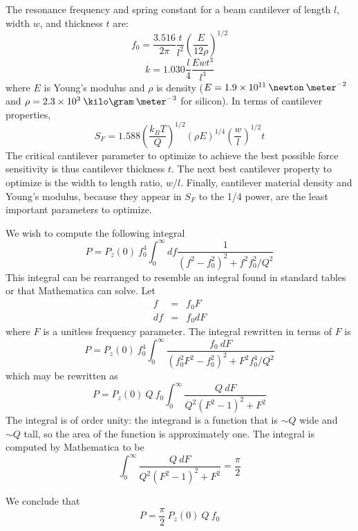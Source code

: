 \label{sect:cantilever-design}

The resonance frequency and spring constant for a beam cantilever of
length $l$, width $w$, and thickness $t$ are:
\begin{equation}
f_0 = \frac{3.516}{2 \pi} \frac{t}{l^2} \left( \frac{E}{12 \rho} \right)^{1/2}
\end{equation}
\begin{equation}
k = 1.030 \frac{l}{4} \frac{E w t^3}{l^3}
\end{equation}
where $E$ is Young's modulus and $\rho$ is density ($E = 1.9 \times
10^{11} \: \newton \: \meter^{-2}$ and $\rho = 2.3 \times 10^{3} \:
\kilo\gram \: \meter^{-3}$ for silicon).  In terms of cantilever properties,
\begin{equation}
S_F = 1.588 \left( \frac{k_B T}{Q} \right)^{1/2} (\rho E)^{1/4} \left( \frac{w}{l} \right)^{1/2} t 
\end{equation}
The critical cantilever parameter to optimize to achieve the best
possible force sensitivity is thus cantilever thickness $t$.  The next
best cantilever property to optimize is the width to length ratio,
$w/l$.  Finally, cantilever material density and Young's modulus, because they
appear in $S_F$ to the 1/4 power, are the least important parameters
to optimize.



\label{sect:appendix-an-integral}

We wish to compute the following integral
\begin{equation}
P = P_z(0) \: f_0^4 \int_{0}^{\infty} df \frac{1}{(f^2 - f_0^2)^2 + f^2 f_0^2 / Q^2}
\end{equation}
This integral can be rearranged to resemble an integral found in
standard tables or that Mathematica can solve.  Let
\begin{eqnarray}
f & = & f_0 F \\
df & = & f_0 dF 
\end{eqnarray}
where $F$ is a unitless frequency parameter.  The integral rewritten
in terms of $F$ is
\begin{equation}
P = P_z(0) \: f_0^4 \int_{0}^{\infty} \frac{f_0 \: dF}{(f_0^2 F^2 - f_0^2)^2 + F^2 f_0^4 / Q^2}
\end{equation}
which may be rewritten as
\begin{equation}
P = P_z(0) \: Q \: f_0 \int_{0}^{\infty} \frac{Q \: dF}{Q^2 (F^2 - 1)^2 + F^2}
\end{equation}
The integral is of order unity: the integrand is a function that is
$\sim Q$ wide and $\sim Q$ tall, so the area of the function is
approximately one.  The integral is computed by Mathematica to be
\begin{equation}
\int_{0}^{\infty} \frac{Q \: dF}{Q^2 (F^2 - 1)^2 + F^2} = \frac{\pi}{2}
\end{equation}

We conclude that
\begin{equation}
P = \frac{\pi}{2} \: P_z (0) \: Q \: f_0
\end{equation}






